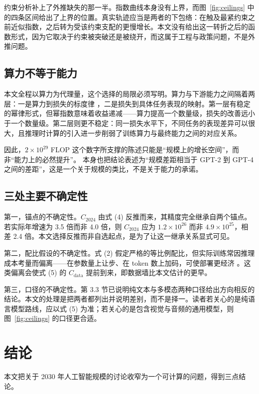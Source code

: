 \documentclass[11pt,a4paper]{article}
\begin{document}
约束分析补上了外推缺失的那一半。指数曲线本身没有上界，而图~\ref{fig:ceilings} 中的四条区间给出了上界的位置。真实轨迹应当是两者的下包络：在触及最紧约束之前近似指数，之后转为受该约束支配的更慢增长。本文没有给出这一转折之后的函数形式，因为它取决于约束被突破还是被绕开，而这属于工程与政策问题，不是外推问题。

\subsection{算力不等于能力}

本文全程以算力为代理量，这个选择的局限必须写明。算力与下游能力之间隔着两层：一是算力到损失的标度律 \citep{kaplan2020,hoffmann2022}，二是损失到具体任务表现的映射。第一层有稳定的幂律形式，但幂指数意味着收益递减——算力提高一个数量级，损失的改善远小于一个数量级。第二层则更不稳定：同一损失水平下，不同任务的表现差异可以很大，且推理时计算的引入进一步削弱了训练算力与最终能力之间的对应关系。

因此，$2\times10^{29}$ FLOP 这个数字所支撑的陈述只能是“规模上的增长空间”，而非“能力上的必然提升”。\citet{epoch2024} 本身也把结论表述为“规模差距相当于 GPT-2 到 GPT-4 之间的差距”，这是一个关于规模的类比，不是关于能力的承诺。

\subsection{三处主要不确定性}

第一，锚点的不确定性。$C_{2024}$ 由式 (4) 反推而来，其精度完全继承自两个锚点。若实际年增速为 3.5 倍而非 4.0 倍，则 $C_{2024}$ 应为 $1.2\times10^{26}$ 而非 $4.9\times10^{25}$，相差 2.4 倍。本文选择反推而非自选起点，是为了让这一继承关系显式可见。

第二，配比假设的不确定性。式 (2) 假定严格的等比例配比，但实际训练常因推理成本考量而偏离——在参数量上让步、在 token 数上加码，可使部署更经济 \citep{hoffmann2022}。这类偏离会使式 (5) 的 $C_{\mathrm{data}}$ 提前到来，即数据墙比本文估计的更早。

第三，口径的不确定性。第 3.3 节已说明纯文本与多模态两种口径给出方向相反的结论。本文的处理是把两者都列出并说明差别，而不是择一。读者若关心的是纯语言模型路线，应以式 (5) 为准；若关心的是包含视觉与音频的通用模型，则图~\ref{fig:ceilings} 的口径更合适。

\section{结论}

本文把关于 2030 年人工智能规模的讨论收窄为一个可计算的问题，得到三点结论。
\end{document}
